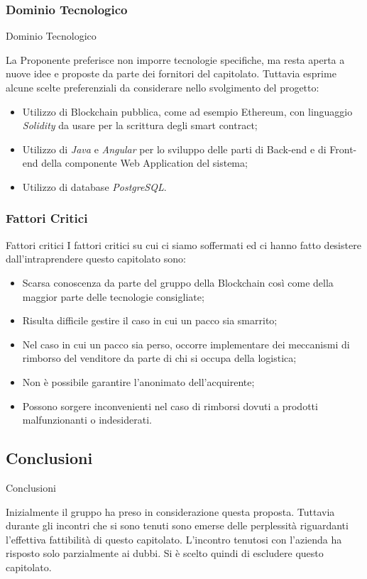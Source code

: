 \documentclass[11pt]{article}
\begin{document}
        \subsubsection{Dominio Tecnologico} Dominio Tecnologico
        
        La Proponente preferisce non imporre tecnologie specifiche, ma resta aperta a nuove idee e proposte da parte dei fornitori del capitolato. Tuttavia esprime alcune scelte preferenziali da considerare nello svolgimento del progetto:	
        \begin{itemize}
		    \item  Utilizzo di Blockchain pubblica, come ad esempio Ethereum, con linguaggio \textit{Solidity} da usare per la scrittura degli smart contract; 
			\item Utilizzo di \textit{Java} e \textit{Angular} per lo sviluppo delle parti di Back-end e di Front-end della componente Web Application del sistema; 
			\item Utilizzo di database \textit{PostgreSQL}.
		\end{itemize}
    
    \subsubsection{Fattori Critici} Fattori critici
    I fattori critici su cui ci siamo soffermati ed ci hanno fatto desistere dall'intraprendere questo capitolato sono:
   \begin{itemize}
		\item Scarsa conoscenza da parte del gruppo della Blockchain così come della maggior parte delle tecnologie consigliate;
		\item Risulta difficile gestire il caso in cui un pacco sia smarrito;
		\item Nel caso in cui un pacco sia perso, occorre implementare dei meccanismi di rimborso del venditore da parte di chi si occupa della logistica;
		\item Non è possibile garantire l’anonimato dell’acquirente;
		\item Possono sorgere inconvenienti nel caso di rimborsi dovuti a prodotti malfunzionanti o indesiderati.
	\end{itemize}
    \subsection{Conclusioni} Conclusioni
    
    Inizialmente il gruppo ha preso in considerazione questa proposta. Tuttavia durante gli incontri che si sono tenuti sono emerse delle perplessità riguardanti l’effettiva fattibilità di questo capitolato. L’incontro tenutosi con l’azienda ha risposto solo parzialmente ai dubbi. Si è scelto quindi di escludere questo capitolato.
    
\end{document}
